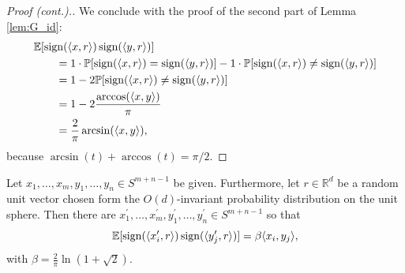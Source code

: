 	\begin{frame}
		\begin{proof}[Proof (cont.).]
			We conclude with the proof of the second part of Lemma \ref{lem:G_id}: 
			\begin{align*}
				&\mathbb{E}[\operatorname{sign}(\langle{x},{r}\rangle) \operatorname{sign}(\langle{y},{r}\rangle)] \\
				&\qquad= 1\cdot\mathbb{P}[\operatorname{sign}(\langle{x},{r}\rangle) = \operatorname{sign} (\langle{y},{r}\rangle )] - 1\cdot \mathbb{P}[\operatorname{sign}(\langle{x},{r}\rangle) \neq \operatorname{sign}(\langle{y},{r}\rangle)] \\
				&\qquad= 1 - 2\mathbb{P}[\operatorname{sign}(\langle{x},{r}\rangle) \neq \operatorname{sign}(\langle{y},{r}\rangle)] \\
				&\qquad= 1 - 2 \frac{\arccos(\langle{x},{y}\rangle)}{\pi} \\
				&\qquad= \frac{2}{\pi} \arcsin(\langle{x},{y}\rangle),
			\end{align*}
			because $\arcsin (t) + \arccos(t) = \pi/2$.
		\end{proof}
	\end{frame}
	\begin{frame}
		\begin{lemma}\label{lem:krivines_trick}
			Let $x_1,\dots,x_m,y_1,\dots,y_n\in S^{m+n-1}$ be given. Furthermore, let $r\in\mathbb{R}^d$ be a random unit vector chosen form the $O(d)$-invariant probability distribution on the unit sphere. Then there are $x_1^\prime,\dots,x_m^\prime, y_1^\prime,\dots,y_n^\prime\in S^{m+n-1}$ so that
			\begin{equation}
				\mathbb{E}[\operatorname{sign}(\langle{x_i^\prime},{r}\rangle)\operatorname{sign}(\langle{y_j^\prime},{r}\rangle)] = \beta \langle{x_i},{y_j}\rangle,
				\label{eq:krivines_trick}
			\end{equation}		
			with $\beta = \frac{2}{\pi} \ln (1+\sqrt{2}).$
		\end{lemma}
	\end{frame}
